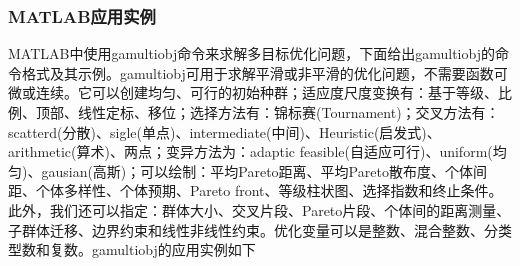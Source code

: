        \subsubsection{MATLAB应用实例}
            \par
            MATLAB中使用gamultiobj命令来求解多目标优化问题，下面给出gamultiobj的命令格式及其示例。gamultiobj可用于求解平滑或非平滑的优化问题，不需要函数可微或连续。它可以创建均匀、可行的初始种群；适应度尺度变换有：基于等级、比例、顶部、线性定标、移位；选择方法有：锦标赛(Tournament)；交叉方法有：scatterd(分散)、sigle(单点)、intermediate(中间)、Heuristic(启发式)、arithmetic(算术)、两点；变异方法为：adaptic feasible(自适应可行)、uniform(均匀)、gausian(高斯)；可以绘制：平均Pareto距离、平均Pareto散布度、个体间距、个体多样性、个体预期、Pareto front、等级柱状图、选择指数和终止条件。此外，我们还可以指定：群体大小、交叉片段、Pareto片段、个体间的距离测量、子群体迁移、边界约束和线性非线性约束。优化变量可以是整数、混合整数、分类型数和复数。gamultiobj的应用实例如下
